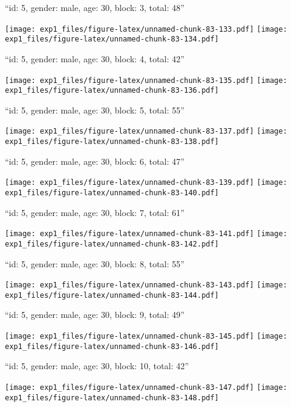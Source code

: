 \documentclass[11pt,,]{article}
\begin{document}
\newpage
[1] 

``id: 5, gender: male, age: 30, block: 3, total: 48''

\texttt{[image: exp1\_files/figure-latex/unnamed-chunk-83-133.pdf]}
\texttt{[image: exp1\_files/figure-latex/unnamed-chunk-83-134.pdf]}

\newpage
[1] 

``id: 5, gender: male, age: 30, block: 4, total: 42''

\texttt{[image: exp1\_files/figure-latex/unnamed-chunk-83-135.pdf]}
\texttt{[image: exp1\_files/figure-latex/unnamed-chunk-83-136.pdf]}

\newpage
[1] 

``id: 5, gender: male, age: 30, block: 5, total: 55''

\texttt{[image: exp1\_files/figure-latex/unnamed-chunk-83-137.pdf]}
\texttt{[image: exp1\_files/figure-latex/unnamed-chunk-83-138.pdf]}

\newpage
[1] 

``id: 5, gender: male, age: 30, block: 6, total: 47''

\texttt{[image: exp1\_files/figure-latex/unnamed-chunk-83-139.pdf]}
\texttt{[image: exp1\_files/figure-latex/unnamed-chunk-83-140.pdf]}

\newpage
[1] 

``id: 5, gender: male, age: 30, block: 7, total: 61''

\texttt{[image: exp1\_files/figure-latex/unnamed-chunk-83-141.pdf]}
\texttt{[image: exp1\_files/figure-latex/unnamed-chunk-83-142.pdf]}

\newpage
[1] 

``id: 5, gender: male, age: 30, block: 8, total: 55''

\texttt{[image: exp1\_files/figure-latex/unnamed-chunk-83-143.pdf]}
\texttt{[image: exp1\_files/figure-latex/unnamed-chunk-83-144.pdf]}

\newpage
[1] 

``id: 5, gender: male, age: 30, block: 9, total: 49''

\texttt{[image: exp1\_files/figure-latex/unnamed-chunk-83-145.pdf]}
\texttt{[image: exp1\_files/figure-latex/unnamed-chunk-83-146.pdf]}

\newpage
[1] 

``id: 5, gender: male, age: 30, block: 10, total: 42''

\texttt{[image: exp1\_files/figure-latex/unnamed-chunk-83-147.pdf]}
\texttt{[image: exp1\_files/figure-latex/unnamed-chunk-83-148.pdf]}
\end{document}
